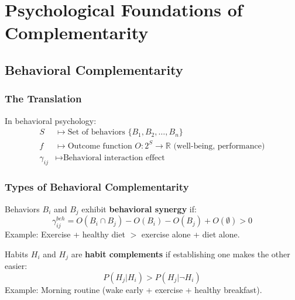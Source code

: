 \section{Psychological Foundations of Complementarity}
\label{sec:psychology}

\subsection{Behavioral Complementarity}

\subsubsection{The Translation}

\begin{axiom}
In behavioral psychology:
\begin{align}
S &\mapsto \text{Set of behaviors } \{B_1, B_2, \ldots, B_n\} \\
f &\mapsto \text{Outcome function } O: 2^S \to \mathbb{R} \text{ (well-being, performance)} \\
\gamma_{ij} &\mapsto \text{Behavioral interaction effect}
\end{align}
\end{axiom}

\subsubsection{Types of Behavioral Complementarity}

\begin{definition}
Behaviors $B_i$ and $B_j$ exhibit \textbf{behavioral synergy} if:
\begin{equation}
\gamma^{beh}_{ij} = O(B_i \cap B_j) - O(B_i) - O(B_j) + O(\emptyset) > 0
\end{equation}
Example: Exercise + healthy diet $>$ exercise alone + diet alone.
\end{definition}

\begin{definition}
Habits $H_i$ and $H_j$ are \textbf{habit complements} if establishing one makes the other easier:
\begin{equation}
P(H_j | H_i) > P(H_j | \neg H_i)
\end{equation}
Example: Morning routine (wake early + exercise + healthy breakfast).
\end{definition}

